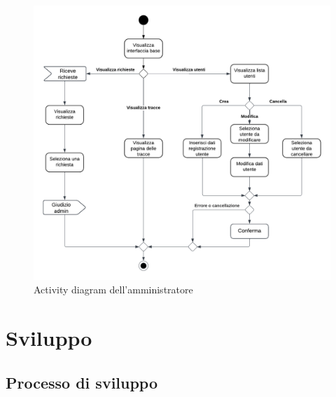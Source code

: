 \documentclass[a4paper]{article}
\begin{document}
\begin{figure}[H]
  \begin{center}
    \includegraphics[width=1\textwidth]{adAmministratore}
  \end{center}
  \caption{Activity diagram dell'amministratore}
  \label{fig:adAmministratore}
\end{figure}

\section{Sviluppo}

\subsection{Processo di sviluppo}
\end{document}
